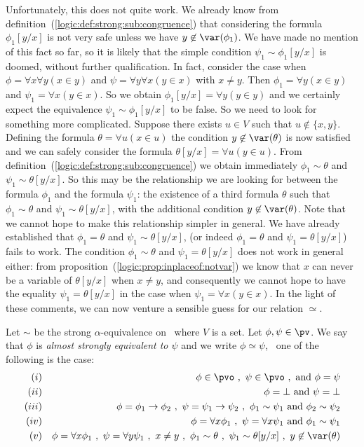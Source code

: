Unfortunately, this does not quite work. We already know from
definition~(\ref{logic:def:strong:sub:congruence}) that considering
the formula $\phi_{1}[y/x]$ is not very safe unless we have
$y\not\in\var(\phi_{1})$. We have made no mention of this fact so
far, so it is likely that the simple condition
$\psi_{1}\sim\phi_{1}[y/x]$ is doomed, without further
qualification. In fact, consider the case when $\phi=\forall
x\forall y (x\in y)$ and $\psi=\forall y\forall x(y\in x)$ with
$x\neq y$. Then $\phi_{1}=\forall y(x\in y)$ and $\psi_{1}=\forall
x(y\in x)$. So we obtain $\phi_{1}[y/x]=\forall y(y\in y)$ and we
certainly expect the equivalence $\psi_{1}\sim\phi_{1}[y/x]$ to be
false. So we need to look for something more complicated. Suppose
there exists $u\in V$ such that $u\not\in\{x,y\}$. Defining the
formula $\theta=\forall u (x\in u)$ the condition
$y\not\in\var(\theta)$ is now satisfied and we can safely consider
the formula $\theta[y/x]=\forall u(y\in u)$. From
definition~(\ref{logic:def:strong:sub:congruence}) we obtain
immediately $\phi_{1}\sim\theta$ and $\psi_{1}\sim\theta[y/x]$. So
this may be the relationship we are looking for between the formula
$\phi_{1}$ and the formula $\psi_{1}$: the existence of a third
formula $\theta$ such that $\phi_{1}\sim\theta$ and
$\psi_{1}\sim\theta[y/x]$, with the additional condition
$y\not\in\var(\theta)$. Note that we cannot hope to make this
relationship simpler in general. We have already established that
$\phi_{1}=\theta$ and $\psi_{1}\sim\theta[y/x]$, (or indeed
$\phi_{1}=\theta$ and $\psi_{1}=\theta[y/x]$) fails to work. The
condition $\phi_{1}\sim\theta$ and $\psi_{1}=\theta[y/x]$ does not
work in general either: from
proposition~(\ref{logic:prop:inplaceof:notvar}) we know that $x$ can
never be a variable of $\theta[y/x]$ when $x\neq y$, and
consequently we cannot hope to have the equality
$\psi_{1}=\theta[y/x]$ in the case when $\psi_{1}=\forall x(y\in
x)$. In the light of these comments, we can now venture a sensible
guess for our relation $\simeq$.

\begin{defin}\label{logic:def:almost:strong:equivalent}
  Let $\sim$ be the strong $\alpha$-equivalence on \pv\ where $V$ is a set. 
  Let $\phi,\psi\in\pv$. We say that $\phi$ is {\em almost strongly equivalent 
  to $\psi$} and we write $\phi\simeq\psi$, \ifand\ one of the following is the 
  case:
    \begin{eqnarray*}
    (i)&&\phi\in\pvo\ ,\ \psi\in\pvo\ ,\ \mbox{and}\ \phi=\psi\\
    (ii)&&\phi=\bot\ \mbox{and}\ \psi=\bot\\
    (iii)&&\phi=\phi_{1}\to\phi_{2}\ ,\ \psi=\psi_{1}\to\psi_{2}\ ,\
    \phi_{1}\sim\psi_{1}\ \mbox{and}\ \phi_{2}\sim\psi_{2}\\
    (iv)&&\phi=\forall x\phi_{1}\ ,\ \psi=\forall x\psi_{1}\ \mbox{and}\ \phi_{1}\sim\psi_{1}\\
    (v)&&\phi=\forall x\phi_{1}\ ,\ \psi=\forall y\psi_{1}\ ,\ x\neq y\ ,\
    \phi_{1}\sim \theta\ ,\ \psi_{1}\sim \theta[y/x]\ ,\ y\not\in\var(\theta)
    \end{eqnarray*}
\end{defin}

